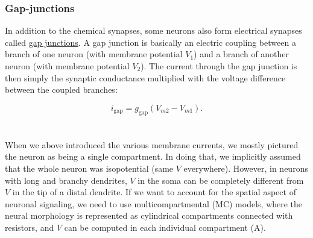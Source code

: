 \subsubsection{Gap-junctions}
In addition to the chemical synapses, some neurons also form electrical synapses called \underline{gap junctions}. A gap junction is basically an electric coupling between a branch of one neuron (with membrane potential $V_1$) and a branch of another neuron (with membrane potential $V_2$). The current through the gap junction is then simply the synaptic conductance multiplied with the voltage difference between the coupled branches:

\begin{equation}
i_\text{gap}=g_\text{gap} (V_{m2}-V_{m1}).
\label{eq:Neuron:gapjunction}
\end{equation}



\section{}
\label{sec:Neuron:morphology}
When we above introduced the various membrane currents, we mostly pictured the neuron as being a single compartment. In doing that, we implicitly assumed that the whole neuron was isopotential (same $V$ everywhere). However, in neurons with long and branchy dendrites, $V$ in the soma can be completely different from $V$ in the tip of a distal dendrite. If we want to account for the spatial aspect of neuronal signaling, we need to use multicompartmental (MC) models, where the neural morphology is represented as cylindrical compartments connected with resistors, and $V$ can be computed in each individual compartment (A). 

